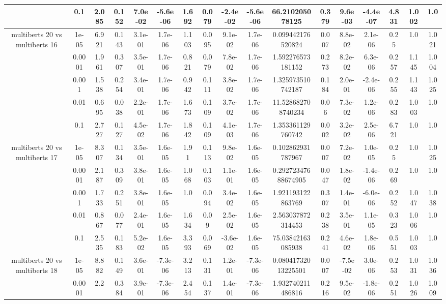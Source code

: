 \begin{tabular}{|c|c|c|c|c|c|c|c|c|c|c|c|c|c|c|c|c|}
 & 0.1 & 2.085 & 0.152 & 7.0e-02 & -5.6e-06 & 1.692 & 0.079 & -2.4e-02 & -5.6e-06 & 66.210205078125 & 0.379 & 9.6e-03 & -4.4e-07 & 4.831 & 1.002 & 1.0 \\
\hline
\multirow{5}{*}{multiberts 20 vs multiberts 16} & 1e-05 & 6.921 & 0.143 & 3.1e-01 & 1.7e-06 & 1.103 & 0.095 & 9.1e-02 & 1.7e-06 & 0.099442176520824 & 0.007 & 8.8e-02 & 2.1e-06 & 0.25 & 1.0 & 1.021 \\
 & 0.0001 & 1.961 & 0.307 & 3.5e-01 & 1.7e-06 & 0.821 & 0.079 & 7.8e-02 & 1.7e-06 & 1.592276573181152 & 0.273 & 8.2e-02 & 6.3e-06 & 0.257 & 1.145 & 1.004 \\
 & 0.001 & 1.538 & 0.254 & 3.4e-01 & 1.7e-06 & 0.942 & 0.111 & 3.8e-02 & 1.7e-06 & 1.325973510742187 & 0.184 & 2.0e-01 & -2.4e-06 & 0.255 & 1.143 & 1.025 \\
 & 0.01 & 0.695 & 0.038 & 2.2e-01 & 1.7e-06 & 1.673 & 0.109 & 3.7e-02 & 1.7e-06 & 11.528682708740234 & 0.06 & 7.3e-02 & 1.2e-06 & 0.283 & 1.003 & 1.0 \\
 & 0.1 & 2.727 & 0.127 & 4.5e-02 & 1.7e-06 & 1.842 & 0.109 & 4.1e-03 & 1.7e-06 & 1.353361129760742 & 0.002 & 3.2e-02 & 2.5e-06 & 6.721 & 1.0 & 1.0 \\
\hline
\multirow{5}{*}{multiberts 20 vs multiberts 17} & 1e-05 & 8.307 & 0.134 & 3.5e-01 & 1.6e-05 & 1.91 & 0.113 & 9.8e-02 & 1.6e-05 & 0.102862931787967 & 0.007 & 7.2e-02 & 1.0e-05 & 0.25 & 1.0 & 1.025 \\
 & 0.0001 & 2.187 & 0.309 & 3.8e-01 & 1.6e-05 & 1.068 & 0.103 & 1.1e-01 & 1.6e-05 & 0.29272347688674905 & 0.047 & 1.8e-02 & -1.4e-06 & 0.269 & 1.0 & 1.0 \\
 & 0.001 & 1.733 & 0.251 & 3.8e-01 & 1.6e-05 & 1.0 & 0.094 & 3.4e-02 & 1.6e-05 & 1.921193122863769 & 0.307 & 1.4e-01 & -6.0e-06 & 0.252 & 1.047 & 1.038 \\
 & 0.01 & 0.867 & 0.077 & 2.4e-01 & 1.6e-05 & 1.634 & 0.09 & 2.5e-02 & 1.6e-05 & 2.563037872314453 & 0.238 & 3.5e-01 & 1.1e-05 & 0.323 & 1.006 & 1.0 \\
 & 0.1 & 2.535 & 0.183 & 5.2e-02 & 1.6e-05 & 3.393 & 0.069 & -3.6e-02 & 1.6e-05 & 75.03842163085938 & 0.241 & 4.6e-02 & 1.8e-06 & 0.551 & 1.003 & 1.0 \\
\hline
\multirow{5}{*}{multiberts 20 vs multiberts 18} & 1e-05 & 8.882 & 0.149 & 3.6e-01 & -7.3e-06 & 3.213 & 0.131 & 1.2e-01 & -7.3e-06 & 0.08041732013225501 & 0.007 & -7.5e-02 & 3.0e-06 & 0.253 & 1.031 & 1.036 \\
 & 0.0001 & 2.2 & 0.384 & 3.9e-01 & -7.3e-06 & 2.454 & 0.137 & 1.4e-01 & -7.3e-06 & 1.932740211486816 & 0.216 & 9.5e-02 & -1.8e-06 & 0.251 & 1.026 & 1.009 \\

\end{tabular}
